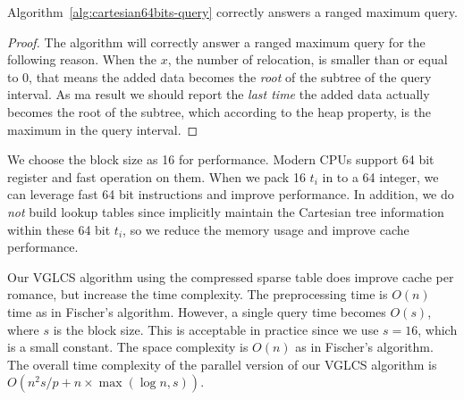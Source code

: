 

\begin{theorem} \label{thm:correctness}
  Algorithm~\ref{alg:cartesian64bits-query} correctly answers a ranged
  maximum query.
\end{theorem}
\begin{proof}
The algorithm will correctly answer a ranged maximum query for the
following reason.  When the $x$, the number of relocation, is smaller
than or equal to 0, that means the added data becomes the {\em root} of
the subtree of the query interval.  As ma result we should report the
{\em last time} the added data actually becomes the root of the
subtree, which according to the heap property, is the maximum in the
query interval.
\end{proof}

We choose the block size as 16 for performance.  Modern CPUs support
64 bit register and fast operation on them.  When we pack 16 $t_i$ in
to a 64 integer, we can leverage fast 64 bit instructions and improve
performance.  In addition, we do {\em not} build lookup tables since
implicitly maintain the Cartesian tree information within these 64
bit $t_i$, so we reduce the memory usage and improve cache
performance.

\iffalse 因所有 $t_i < 16$，使得每個 $l_i$ 可用 4-bit 表示之，整體便可
用 64-bit 長整數表示一棵笛卡爾樹的狀態。為了現在常見的 64-byte 快取列
(cache line) 和 64-bit 暫存器 (register) 考量，我們選用合適的大小進行
測試，不僅壓縮空間使用量，同時也減少快取未中的問題。最後，我們得到壓縮
算法 \ref{alg:cartesian-to-64bits}，其相對應的區間查找算法，根據
Demaine \cite{demaine} 進行修改，得到壓縮下的詢問算法
\ref{alg:cartesian64bits-query}。\fi

Our VGLCS algorithm using the compressed sparse table does improve
cache per romance, but increase the time complexity.  The
preprocessing time is $O(n)$ time as in Fischer's algorithm.  However,
a single query time becomes $O(s)$, where $s$ is the block size.  This
is acceptable in practice since we use $s = 16$, which is a small
constant.  The space complexity is $O(n)$ as in Fischer's algorithm.
The overall time complexity of the parallel version of our VGLCS
algorithm is $O(n^2 s / p + n \times \max(\log n, s))$.

\iffalse
回到 VGLCS 的應用中，上述算法使用壓縮方式降低快取未中。
我們可以使用上述的算法取代原先的并查集，建表的時間複雜度為 $O(n)$，
單一查詢的時間複雜度為 $O(s)$。
整體的時間複雜度為 $O(n^2 \; s / p + n \max(\log n, s))$。
\fi
